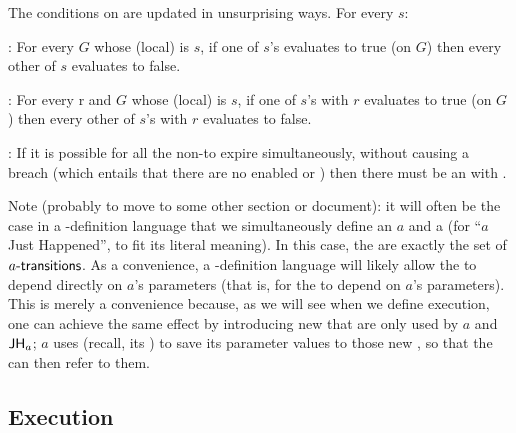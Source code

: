 \documentclass[12pt]{article}
\begin{document}
The conditions on \TGuards are updated in unsurprising ways. For every \State $s$:

\noindent {}: For every \GlobalState $G$ whose (local) \State is $s$, if one of $s$'s \mustntrans evaluates to true (on $G$) then every other \TGuard of $s$ evaluates to false. 
\medskip

\noindent {}: For every \Role r and \GlobalState $G$ whose (local) \State is $s$, if one of $s$'s \rmustntrans with \Role $r$ evaluates to true (on $G$) then every other of $s$'s \rmustntrans with \Role $r$ evaluates to false.
\medskip

\noindent {}: If it is possible for all the \enabled non-\Env \transitions to expire simultaneously, without causing a breach (which entails that there are no enabled \mustntrans or \rmustntrans) then there must be an \depTrans{\Env} with \Deadline \nodeadline.



\bigskip

Note (probably to move to some other section or document): it will often be the case in a \Contract-definition language that we simultaneously define an \Action $a$ and a \State {} (for ``$a$ Just Happened'', to fit its literal meaning). In this case, the  are exactly the set of $a\textsf{-transitions}$. As a convenience, a \Contract-definition language will likely allow the  to depend directly on $a$'s parameters (that is, for the \TGuard 
to depend on $a$'s parameters). This is merely a convenience because, as we will see when we define execution, one can achieve the same effect by introducing new \GVars that are only used by $a$ and $\textsf{JH}_{a}$; $a$ uses  (recall, its \gvTransform) to save its parameter values to those new \GVars, so that the  can then refer to them.

\subsection{Execution}
\end{document}
